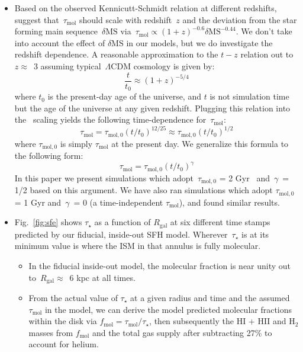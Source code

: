 \documentclass[fleqn, usenatbib]{mnras}
\begin{document}
\begin{itemize}
	\item Based on the observed Kennicutt-Schmidt relation at different 
	redshifts,~\citet{Tacconi2018} suggest that~$\tau_\text{mol}$ should 
	scale with redshift~$z$ and the deviation from the star forming main 
	sequence~$\delta\text{MS}$ via~$\tau_\text{mol} \propto (1 + z)^{-0.6} 
	\delta\text{MS}^{-0.44}$. We don't take into account the effect of 
	$\delta\text{MS}$ in our models, but we do investigate the redshift 
	dependence. A reasonable approximation to the $t-z$ relation out 
	to~$z \approx$~3 assuming typical~$\Lambda$CDM cosmology is given by: 
	\begin{equation} 
	\frac{t}{t_0} \approx (1 + z)^{-5/4} 
	\end{equation} 
	where $t_0$ is the present-day age of the universe, and $t$ is not 
	simulation time but the age of the universe at any given redshift. 
	Plugging this relation into the~\citet{Tacconi2018} scaling yields the 
	following time-dependence for~$\tau_\text{mol}$: 
	\begin{equation} 
	\tau_\text{mol} = \tau_{\text{mol},0}(t/t_0)^{12/25} \approx 
	\tau_{\text{mol},0}(t/t_0)^{1/2} 
	\end{equation} 
	where $\tau_{\text{mol},0}$ is simply $\tau_\text{mol}$ at the 
	present day. We generalize this formula to the following form: 
	\begin{equation} 
	\tau_\text{mol} = \tau_{\text{mol},0}(t/t_0)^\gamma 
	\end{equation} 
	In this paper we present simulations which adopt~$\tau_{\text{mol},0}$ 
	= 2 Gyr~\citep{Leroy2008, Leroy2013, Tacconi2018} and~$\gamma$~= 1/2 based 
	on this argument. We have also ran simulations which adopt 
	$\tau_{\text{mol},0}$ = 1 Gyr and~$\gamma$~= 0 (a time-independent 
	$\tau_{\text{mol}}$), and found similar results. 

	\item Fig.~\ref{fig:sfe} shows $\tau_\star$ as a function of $R_\text{gal}$ 
	at six different time stamps predicted by our fiducial, inside-out SFH 
	model. Wherever~$\tau_\star$ is at its minimum value is where the ISM in 
	that annulus is fully molecular. 
	\begin{itemize} 
		\item In the fiducial inside-out model, the molecular fraction is near 
		unity out to~$R_\text{gal} \approx$~6 kpc at all times. 

		\item From the actual value of $\tau_\star$ at a given radius and time 
		and the assumed $\tau_\text{mol}$ in the model, we can derive the 
		model predicted molecular fractions within the disk via 
		$f_\text{mol} = \tau_\text{mol}/\tau_\star$, then subsequently the 
		HI + HII and H$_2$ masses from $f_\text{mol}$ and the total gas supply 
		after subtracting 27\% to account for helium. 


\end{itemize}
\end{itemize}
\end{document}
